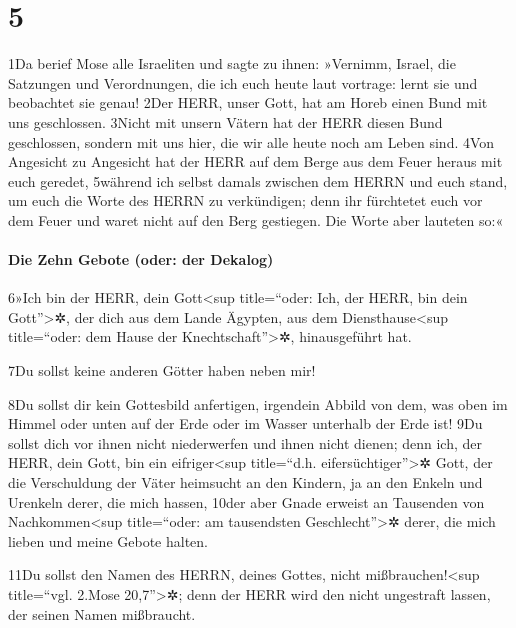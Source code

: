 \hypertarget{section-4}{%
\section{5}\label{section-4}}

1Da berief Mose alle Israeliten und sagte zu ihnen: »Vernimm, Israel,
die Satzungen und Verordnungen, die ich euch heute laut vortrage: lernt
sie und beobachtet sie genau! 2Der HERR, unser Gott, hat am Horeb einen
Bund mit uns geschlossen. 3Nicht mit unsern Vätern hat der HERR diesen
Bund geschlossen, sondern mit uns hier, die wir alle heute noch am Leben
sind. 4Von Angesicht zu Angesicht hat der HERR auf dem Berge aus dem
Feuer heraus mit euch geredet, 5während ich selbst damals zwischen dem
HERRN und euch stand, um euch die Worte des HERRN zu verkündigen; denn
ihr fürchtetet euch vor dem Feuer und waret nicht auf den Berg
gestiegen. Die Worte aber lauteten so:«

\hypertarget{die-zehn-gebote-oder-der-dekalog}{%
\paragraph{Die Zehn Gebote (oder: der
Dekalog)}\label{die-zehn-gebote-oder-der-dekalog}}

6»Ich bin der HERR, dein Gott\textless sup title=``oder: Ich, der HERR,
bin dein Gott''\textgreater✲, der dich aus dem Lande Ägypten, aus dem
Diensthause\textless sup title=``oder: dem Hause der
Knechtschaft''\textgreater✲, hinausgeführt hat.

7Du sollst keine anderen Götter haben neben mir!

8Du sollst dir kein Gottesbild anfertigen, irgendein Abbild von dem, was
oben im Himmel oder unten auf der Erde oder im Wasser unterhalb der Erde
ist! 9Du sollst dich vor ihnen nicht niederwerfen und ihnen nicht
dienen; denn ich, der HERR, dein Gott, bin ein eifriger\textless sup
title=``d.h. eifersüchtiger''\textgreater✲ Gott, der die Verschuldung
der Väter heimsucht an den Kindern, ja an den Enkeln und Urenkeln derer,
die mich hassen, 10der aber Gnade erweist an Tausenden von
Nachkommen\textless sup title=``oder: am tausendsten
Geschlecht''\textgreater✲ derer, die mich lieben und meine Gebote
halten.

11Du sollst den Namen des HERRN, deines Gottes, nicht
mißbrauchen!\textless sup title=``vgl. 2.Mose 20,7''\textgreater✲; denn
der HERR wird den nicht ungestraft lassen, der seinen Namen mißbraucht.

